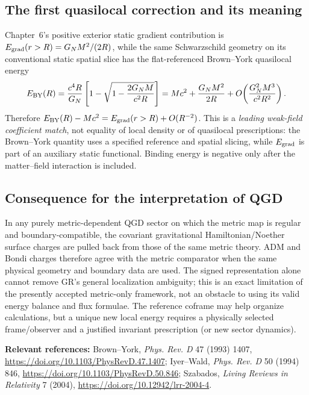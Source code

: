 \documentclass[11pt,a4paper]{article}
\begin{document}
\subsection{The first quasilocal correction and its meaning}
Chapter~6's positive exterior static gradient contribution is
$E_{\rm grad}(r>R)=G_NM^2/(2R)$, while the same Schwarzschild geometry
on its conventional static spatial slice has the flat-referenced
Brown--York quasilocal energy
\begin{equation}\label{eq:qgd139-by}
E_{\rm BY}(R)=\frac{c^4 R}{G_N}
\left[1-\sqrt{1-\frac{2G_NM}{c^2R}}\right]
=Mc^2+\frac{G_NM^2}{2R}
+O\!\left(\frac{G_N^2M^3}{c^2R^2}\right).
\end{equation}
Therefore $E_{\rm BY}(R)-Mc^2=E_{\rm grad}(r>R)+O(R^{-2})$.
This is a \emph{leading weak-field coefficient match}, not equality
of local density or of quasilocal prescriptions: the Brown--York quantity
uses a specified reference and spatial slicing, while $E_{\rm grad}$
is part of an auxiliary static functional. Binding energy is negative
only after the matter--field interaction is included.

\subsection{Consequence for the interpretation of QGD}
In any purely metric-dependent QGD sector on which the metric map is
regular and boundary-compatible, the covariant gravitational
Hamiltonian/Noether surface charges are pulled back from those of the
same metric theory. ADM and Bondi charges therefore agree with the
metric comparator when the same physical geometry and boundary data
are used. The signed representation alone cannot remove GR's general
localization ambiguity; this is an exact limitation of the presently
accepted metric-only framework, not an obstacle to using its valid
energy balance and flux formulae. The reference coframe may help
organize calculations, but a unique new local energy requires a
physically selected frame/observer and a justified invariant prescription
(or new sector dynamics).

\noindent\textbf{Relevant references:}
Brown--York, \emph{Phys. Rev. D} 47 (1993) 1407,
\url{https://doi.org/10.1103/PhysRevD.47.1407};
Iyer--Wald, \emph{Phys. Rev. D} 50 (1994) 846,
\url{https://doi.org/10.1103/PhysRevD.50.846};
Szabados, \emph{Living Reviews in Relativity} 7 (2004),
\url{https://doi.org/10.12942/lrr-2004-4}.


\end{document}
